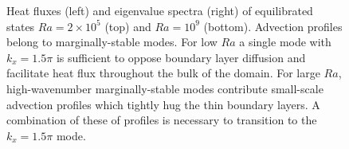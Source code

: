 \documentclass[reprint,amsmath,amssymb,aps]{revtex4-1}
\begin{document}
\begin{figure}[t]
    \centering
    \hfill
    \caption{Heat fluxes (left) and eigenvalue spectra (right) of equilibrated states $Ra = 2 \times 10^5$ (top) and $Ra = 10^9$ (bottom). Advection profiles belong to marginally-stable modes. For low $Ra$ a single mode with $k_x = 1.5\pi$ is sufficient to oppose  boundary layer diffusion and facilitate heat flux throughout the bulk of the domain. For large $Ra$, high-wavenumber marginally-stable modes contribute small-scale advection profiles which tightly hug the thin boundary layers. A combination of these of profiles is necessary to transition to the $k_x = 1.5\pi$ mode.}
    \label{fig:flux}
\end{figure}
\end{document}
